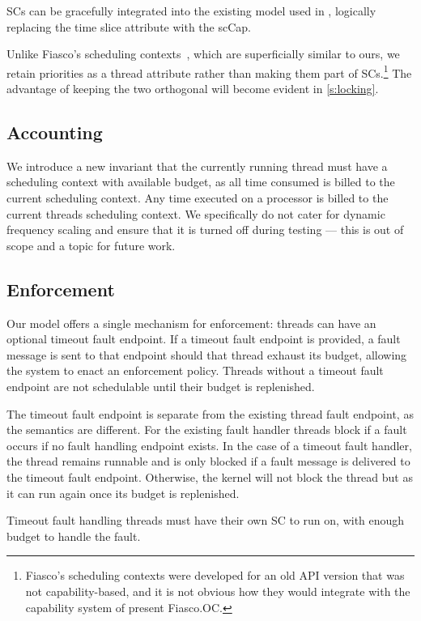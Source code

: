 \glspl{SC} can be gracefully integrated into the 
existing model used in \selfour,
logically replacing the time slice attribute with the scCap. 

Unlike Fiasco's scheduling contexts~\citep{Lackorzynski_WVH_12}, which
are superficially similar to ours, we retain priorities as a thread
attribute rather than making them part of SCs.\footnote{Fiasco's scheduling
contexts were developed for an old API version that was not
capability-based, and it is not obvious how they would integrate
with the capability system of present Fiasco.OC.} The advantage of keeping the two
orthogonal will become evident in \cref{s:locking}.

\subsection{Accounting}

We introduce a new invariant that the currently running thread must have a scheduling context 
with available budget, as all time consumed is billed to the current scheduling context.
Any time executed on a processor is billed to the current threads scheduling
context. We specifically do not cater for dynamic frequency scaling and ensure that it is turned off
during testing --- this is out of scope and a topic for future work. 

\subsection{Enforcement}

Our model offers a single mechanism for enforcement: threads can have an optional timeout fault
endpoint.
If a timeout fault endpoint is provided, a fault message is sent to that endpoint should that thread
exhaust its budget, allowing the system to enact an enforcement policy.
Threads without a timeout fault endpoint are not schedulable until their budget is replenished.

The timeout fault
endpoint is separate from the existing thread fault endpoint, as the semantics are different. For the
existing fault handler threads block if a fault occurs if no fault handling endpoint exists. In the
case of a timeout fault handler, the thread remains runnable and is only blocked if a fault message
is delivered to the timeout fault endpoint. Otherwise, the kernel will not block the thread but
as it can run again once its budget is replenished.

Timeout fault handling threads must have their own \gls{SC} to run on, with enough budget to handle
the fault.


